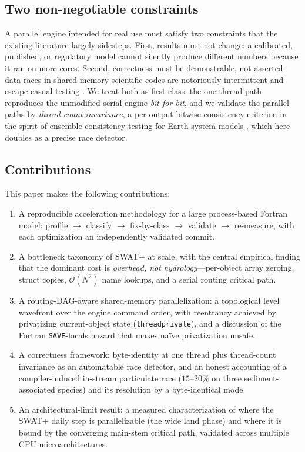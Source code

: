 \subsection{Two non-negotiable constraints}
A parallel engine intended for real use must satisfy two constraints that the existing
literature largely sidesteps. First, results must not change: a calibrated,
published, or regulatory model cannot silently produce different numbers because it ran on
more cores. Second, correctness must be demonstrable, not asserted---data races in
shared-memory scientific codes are notoriously intermittent and escape casual testing
\citep{Atzeni2016ARCHER}. We treat both as first-class: the one-thread path reproduces the
unmodified serial engine \emph{bit for bit}, and we validate the parallel paths by
\emph{thread-count invariance}, a per-output bitwise consistency criterion in the spirit of
ensemble consistency testing for Earth-system models \citep{Baker2015CESMECT}, which here
doubles as a precise race detector.

\subsection{Contributions}
This paper makes the following contributions:
\begin{enumerate}
  \item A reproducible acceleration methodology for a large process-based Fortran model:
        profile $\rightarrow$ classify $\rightarrow$ fix-by-class $\rightarrow$ validate
        $\rightarrow$ re-measure, with each optimization an independently validated commit.
  \item A bottleneck taxonomy of SWAT+ at scale, with the central empirical finding
        that the dominant cost is \emph{overhead, not hydrology}---per-object array zeroing,
        struct copies, $\mathcal{O}(N^2)$ name lookups, and a serial routing critical path.
  \item A routing-DAG-aware shared-memory parallelization: a topological level
        wavefront over the engine command order, with reentrancy achieved by privatizing
        current-object state (\texttt{threadprivate}), and a discussion of the
        Fortran \texttt{SAVE}-locals hazard that makes na\"ive privatization unsafe.
  \item A correctness framework: byte-identity at one thread plus thread-count
        invariance as an automatable race detector, and an honest accounting of a compiler-induced
        in-stream particulate race ($15$--$20\%$ on three sediment-associated species) and its
        resolution by a byte-identical mode.
  \item An architectural-limit result: a measured characterization of where the
        SWAT+ daily step is parallelizable (the wide land phase) and where it is bound by the
        converging main-stem critical path, validated across multiple CPU microarchitectures.
\end{enumerate}

